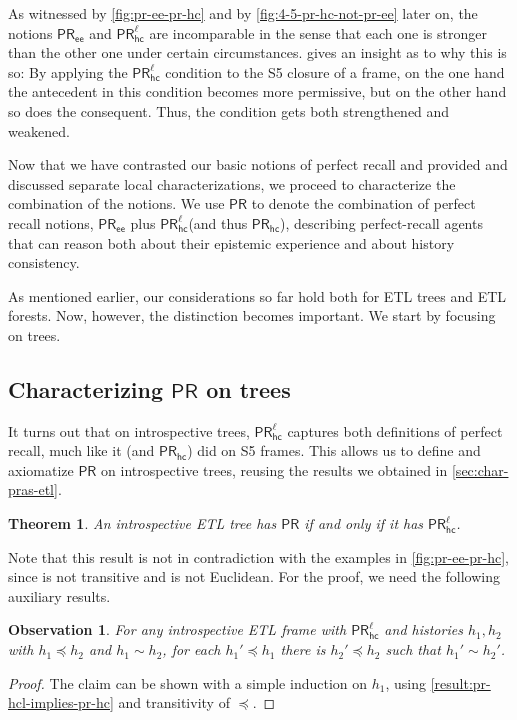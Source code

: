 \documentclass{article}
\newcommand{\PR}{\ensuremath{\mathsf{PR}}\xspace}
\newcommand{\PRhc}{\ensuremath{\mathsf{PR_{hc}}}\xspace}
\newcommand{\PRhcl}{\ensuremath{\mathsf{PR_{hc}^\ell}}\xspace}
\newcommand{\PRee}{\ensuremath{\mathsf{PR_{ee}}}\xspace}
\newcommand{\acc}{\sim}
\newcommand{\tiff}{if and only if\xspace}
\newcounter{#1}
\newtheorem{observation}{Observation}[section]
\newtheorem{observation}{Observation}
\newtheorem{theorem}{Theorem}[section]
\begin{document}
As witnessed by \cref{fig:pr-ee-pr-hc} and by \cref{fig:4-5-pr-hc-not-pr-ee} later on,
the notions \PRee and \PRhcl are incomparable in the sense that
each one is stronger than the other one under certain circumstances.
 gives an insight as to why this is so:
By applying the \PRhcl condition to the S5 closure of a frame,
on the one hand the antecedent in this condition becomes more permissive,
but on the other hand so does the consequent.
Thus, the condition gets both strengthened and weakened.

\bigskip

Now that we have contrasted our basic notions of perfect recall
and provided and discussed separate local characterizations,
we proceed to characterize the combination of the notions.
We use \PR to denote the combination of perfect recall notions,
\PRee plus \PRhcl (and thus \PRhc),
describing perfect-recall agents that can reason both
about their epistemic experience and about history consistency.

As mentioned earlier,
our considerations so far hold both for ETL trees and ETL forests.
Now, however, the distinction becomes important.
We start by focusing on trees.

\subsection{Characterizing \PR on trees}

It turns out that on introspective trees, \PRhcl captures both definitions of perfect recall,
much like it (and \PRhc) did on S5 frames.
This allows us to define and axiomatize \PR on introspective trees,
reusing the results we obtained in \cref{sec:char-pras-etl}.

\begin{theorem}
  \label{result:pr-hcl-equiv-pr}
  An introspective ETL tree has \PR \tiff it has \PRhcl.
\end{theorem}

Note that this result is not in contradiction with the examples in \cref{fig:pr-ee-pr-hc},
since  is not transitive and  is not Euclidean.
For the proof, we need the following auxiliary results.

\begin{observation}
  \label{result:acc-along-history}
  For any introspective ETL frame with \PRhcl and
  histories $h_1,h_2$ with $h_1\preceq h_2$ and $h_1\acc h_2$,
  for each $h_1'\preceq h_1$ there is $h_2'\preceq h_2$ such that $h_1'\acc h_2'$.
\end{observation}
\begin{proof}
  The claim can be shown with a simple induction on $h_1$,
  using \cref{result:pr-hcl-implies-pr-hc} and transitivity of $\preceq$.
\end{proof}
\end{document}
